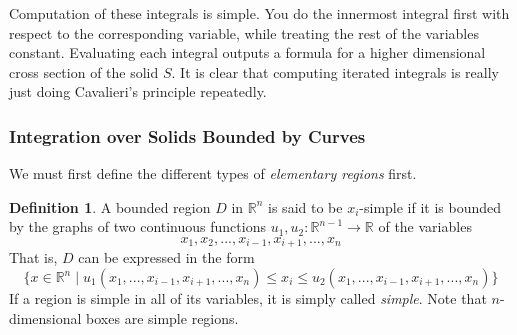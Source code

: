 \documentclass{article}
\theoremstyle{remark}
\theoremstyle{definition}
\newtheorem{definition}{Definition}[section]
\begin{document}
Computation of these integrals is simple. You do the innermost integral first with respect to the corresponding variable, while treating the rest of the variables constant. Evaluating each integral outputs a formula for a higher dimensional cross section of the solid $S$. It is clear that computing iterated integrals is really just doing Cavalieri's principle repeatedly. 

\subsubsection{Integration over Solids Bounded by Curves}
We must first define the different types of \textit{elementary regions} first. 
\begin{definition}
A bounded region $D$ in $\mathbb{R}^n$ is said to be $x_i$-simple if it is bounded by the graphs of two continuous functions $u_1, u_2: \mathbb{R}^{n-1} \longrightarrow \mathbb{R}$ of the variables 
\[x_1, x_2, ..., x_{i-1}, x_{i+1}, ..., x_n\]
That is, $D$ can be expressed in the form 
\[\{ x \in \mathbb{R}^n \; | \; u_1 (x_1,..., x_{i-1}, x_{i+1}, ... , x_n) \leq x_i \leq u_2 (x_1, ..., x_{i-1}, x_{i+1}, ..., x_n)\}\]
If a region is simple in all of its variables, it is simply called \textit{simple}. Note that $n$-dimensional boxes are simple regions. 
\end{definition}
\end{document}
